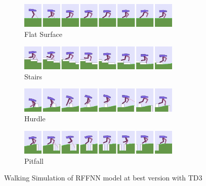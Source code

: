 \documentclass[a4paper, 12pt]{article} %
\begin{document}
\begin{figure}[!ht]
	\centering
	\begin{subfigure}{.9\textwidth}
		\centering
		\includegraphics[width=0.85\textwidth]{figures/bipedal/anim/ff_flat.png}
		\caption{Flat Surface}
		\label{fig:anim_rffnn_flat}
	\end{subfigure}
	\begin{subfigure}{.9\textwidth}
		\centering
		\includegraphics[width=0.85\textwidth]{figures/bipedal/anim/ff_stairs.png}
		\caption{Stairs}
		\label{fig:anim_rffnn_stairs}
	\end{subfigure}
	\begin{subfigure}{.9\textwidth}
		\centering
		\includegraphics[width=0.85\textwidth]{figures/bipedal/anim/ff_hurdle.png}
		\caption{Hurdle}
		\label{fig:anim_rffnn_hurdle}
	\end{subfigure}
	\begin{subfigure}{.9\textwidth}
		\centering
		\includegraphics[width=0.85\textwidth]{figures/bipedal/anim/ff_pitfall.png}
		\caption{Pitfall}
		\label{fig:anim_rffnn_pitfall}
	\end{subfigure}
	\caption{Walking Simulation of RFFNN model at best version with TD3}
	\label{fig:rffnn_simulation}
\end{figure}
\end{document}
